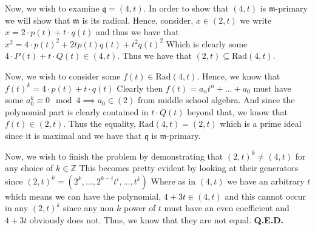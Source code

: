 \documentclass{article}
\begin{document}
\medskip
\noindent
Now, we wish to examine $\mathfrak{q} = (4,t)$. In order to show that $(4,t)$ is $\mathfrak{m}$-primary we will show that $\mathfrak{m}$ is its radical. Hence, consider, $x \in (2,t)$ we write $x = 2 \cdot p(t) + t \cdot q(t)$ and thus we have that $x^2 = 4\cdot p(t)^2+2tp(t)q(t) + t^2q(t)^2$ Which is clearly some $4\cdot P(t) + t \cdot Q(t) \in (4,t)$. Thus we have that $(2,t) \subseteq \text{Rad}(4,t)$. 

\medskip
\noindent
Now, we wish to consider some $f(t)\in \text{Rad}(4,t)$. Hence, we know that $f(t)^k = 4\cdot p(t)+t\cdot q(t)$ Clearly then $f(t) = a_nt^n + \dots +a_0$ must have some $a_0^k \equiv 0 \mod 4 \implies a_0 \in (2)$ from middle school algebra. And since the polynomial part is clearly contained in $t \cdot Q(t)$ beyond that, we know that $f(t)\in(2,t)$. Thus the equality, $\text{Rad}(4,t)=(2,t)$ which is a prime ideal since it is maximal and we have that $\mathfrak{q}$ is $\mathfrak{m}$-primary. 

\medskip
\noindent
Now, we wish to finish the problem by demonstrating that $(2,t)^k \not = (4,t)$ for any choice of $k \in \mathbb{Z}$ This becomes pretty evident by looking at their generators since $(2,t)^k = (2^k, \dots, 2^{k-i}t^i, \dots, t^k)$ Where as in $(4,t)$ we have an arbitrary $t$ which means we can have the polynomial, $4+3t \in (4,t)$ and this cannot occur in any $(2,t)^k$ since any non $k$ power of $t$ must have an even coefficient and $4+3t$ obviously does not. Thus, we know that they are not equal. \textbf{Q.E.D.}
\end{document}
